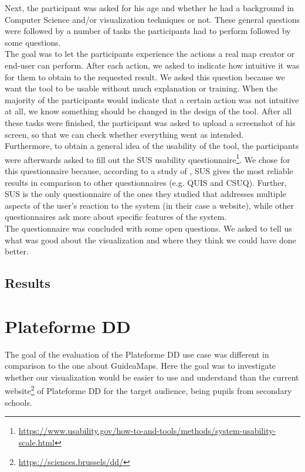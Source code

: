 Next, the participant was asked for his age and whether he had a background in Computer Science and/or visualization techniques or not. These general questions were followed by a number of tasks the participants had to perform followed by some questions.\\

The goal was to let the participants experience the actions a real map creator or end-user can perform. After each action, we asked to indicate how intuitive it was for them to obtain to the requested result. We asked this question because we want the tool to be usable without much explanation or training. When the majority of the participants would indicate that a certain action was not intuitive at all, we know something should be changed in the design of the tool. After all these tasks were finished, the participant was asked to upload a screenshot of his screen, so that we can check whether everything went as intended.\\

Furthermore, to obtain a general idea of the usability of the tool, the participants were afterwards asked to fill out the SUS usability questionnaire\footnote{\url{https://www.usability.gov/how-to-and-tools/methods/system-usability-scale.html}}. We chose for this questionnaire because, according to a study of \cite{tullis2004comparison}, SUS gives the most reliable results in comparison to other questionnaires (e.g. QUIS and CSUQ). Further, SUS is the only questionnaire of the ones they studied that addresses multiple aspects of the user's reaction to the system (in their case a website), while other questionnaires ask more about specific features of the system.\\

The questionnaire was concluded with some open questions. We asked to tell us what was good about the visualization and where they think we could have done better.

\subsection{Results}




\section{Plateforme DD}
The goal of the evaluation of the Plateforme DD use case was different in comparison to the one about GuideaMaps. Here the goal was to investigate whether our visualization would be easier to use and understand than the current website\footnote{\url{https://sciences.brussels/dd/}} of Plateforme DD for the target audience, being pupils from secondary schools.\\

